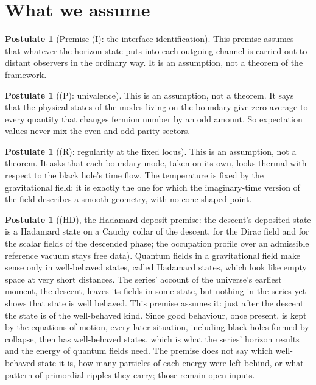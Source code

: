 \documentclass[11pt]{article}
\theoremstyle{definition}
\newtheorem{postulate}[theorem]{Postulate}
\theoremstyle{plain}
\begin{document}
\section{What we assume}

\begin{postulate}[Premise (I): the interface identification]\label{c:hawking.premise-i-interface-identification}
This premise assumes that whatever the horizon state puts into each outgoing channel is carried out to distant observers in the ordinary way. It is an assumption, not a theorem of the framework.
\end{postulate}

\begin{postulate}[(P): univalence]\label{c:singularity.p-univalence}
This is an assumption, not a theorem. It says that the physical states of the modes living on the boundary give zero average to every quantity that changes fermion number by an odd amount. So expectation values never mix the even and odd parity sectors.
\end{postulate}

\begin{postulate}[(R): regularity at the fixed locus]\label{c:singularity.r-regularity-fixed-locus}
This is an assumption, not a theorem. It asks that each boundary mode, taken on its own, looks thermal with respect to the black hole's time flow. The temperature is fixed by the gravitational field: it is exactly the one for which the imaginary-time version of the field describes a smooth geometry, with no cone-shaped point.
\end{postulate}

\begin{postulate}[(HD), the Hadamard deposit premise: the descent's deposited state is a Hadamard state on a Cauchy collar of the descent, for the Dirac field and for the scalar fields of the descended phase; the occupation profile over an admissible reference vacuum stays free data]\label{c:synthesis.hadamard-deposit-premise}
Quantum fields in a gravitational field make sense only in well-behaved states, called Hadamard states, which look like empty space at very short distances. The series' account of the universe's earliest moment, the descent, leaves its fields in some state, but nothing in the series yet shows that state is well behaved. This premise assumes it: just after the descent the state is of the well-behaved kind. Since good behaviour, once present, is kept by the equations of motion, every later situation, including black holes formed by collapse, then has well-behaved states, which is what the series' horizon results and the energy of quantum fields need. The premise does not say which well-behaved state it is, how many particles of each energy were left behind, or what pattern of primordial ripples they carry; those remain open inputs.
\end{postulate}
\end{document}
